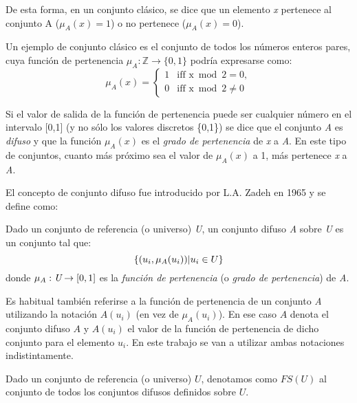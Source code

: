 De esta forma, en un conjunto clásico, se dice que un elemento \emph{x} pertenece al conjunto A ($\mu_{A}(x)=1$) o no pertenece ($\mu_{A}(x)=0$). 
\begin{example}
\normalfont
Un ejemplo de conjunto clásico es el conjunto de todos los números enteros pares, cuya función de pertenencia $\mu_{A}:\mathbb{Z}\rightarrow\{0,1\}$ podría expresarse como:
\begin{equation}
\mu_{A}(x)=\begin{cases} 1 & \mbox{iff } \mbox{x}\bmod 2=0, \\ 0 & \mbox{iff } \mbox{x}\bmod 2\ne 0 \end{cases}
\end{equation}
\end{example}
Si el valor de salida de la función de pertenencia puede ser cualquier número en el intervalo [0,1] (y no sólo los valores discretos \{0,1\}) se dice que el conjunto \emph{A} es \emph{difuso} y que la función $\mu_{A}(x)$ es el \emph{grado de pertenencia} de \emph{x} a \emph{A}. En este tipo de conjuntos, cuanto más próximo sea el valor de $\mu_{A}(x)$ a 1, más pertenece \emph{x} a \emph{A}.

El concepto de conjunto difuso fue introducido por L.A. Zadeh en 1965 \cite{Zadeh65} y se define como:
\begin{definition}
Dado un conjunto de referencia (o universo) \emph{U}, un conjunto difuso \emph{A} sobre \emph{U} es un conjunto tal que:\\
\begin{equation}
\{(u_{i},\mu_{A}(u_{i}))\arrowvert u_{i} \in U\}
\end{equation}
donde \begin{math}\mu_A:\emph{U}\rightarrow[0,1]\end{math} es la \emph{función de pertenencia} (o \emph{grado de pertenencia}) de \emph{A}.
\end{definition}
Es habitual también referirse a la función de pertenencia de un conjunto \emph{A} utilizando la notación $A(u_i)$ (en vez de $\mu_A(u_i)$). En ese caso $A$ denota el conjunto difuso $A$ y $A(u_i)$ el valor de la función de pertenencia de dicho conjunto para el elemento $u_i$. En este trabajo se van a utilizar ambas notaciones indistintamente.

\begin{definition}
Dado un conjunto de referencia (o universo) $U$, denotamos como $FS(U)$ al conjunto de todos los conjuntos difusos definidos sobre $U$.
\end{definition}

